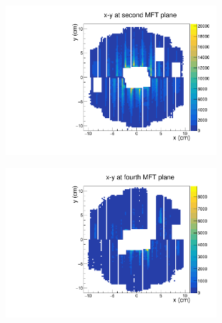 \documentclass[10pt]{beamer}
\begin{document}
\begin{frame}
\begin{columns}[T]
\begin{column}{0.5\textwidth}
            \begin{figure}
                \begin{center}
                    \includegraphics[width=0.7\textwidth]{Plots/pass3_MFT/x_y_2_pass3.pdf}
                \end{center}
            \end{figure}
            \vspace*{-0.7cm}
            \begin{figure}
                \begin{center}
                    \includegraphics[width=0.7\textwidth]{Plots/pass3_MFT/x_y_4_pass3.pdf}
                \end{center}
            \end{figure}
        \end{column}
    \end{columns}

\end{frame}
\end{document}
